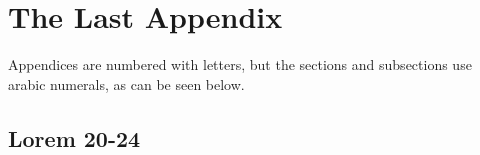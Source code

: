 \chapter{The Last Appendix}
\label{app:n}
Appendices are numbered with letters, but the sections and subsections use
arabic numerals, as can be seen below.

\section{Lorem 20-24}

